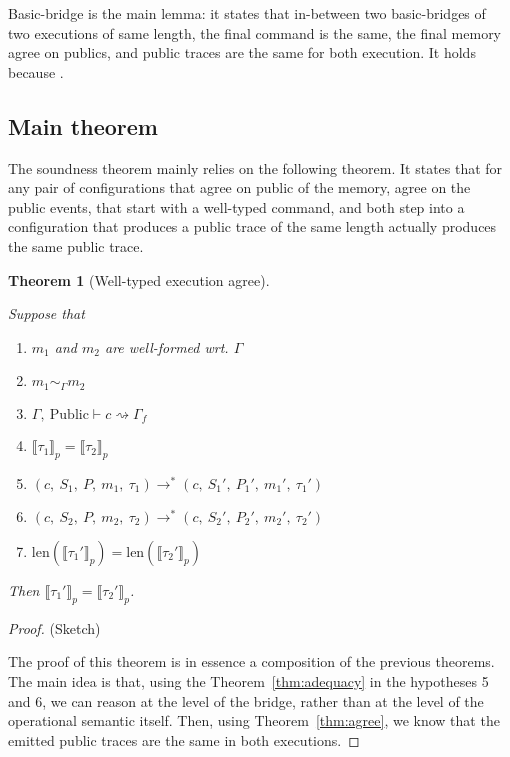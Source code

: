 \documentclass[10pt]{article}
\newcommand{\ctx}{\Gamma}
\newcommand{\typing}[4]{ #1,~#2 \vdash #3 \rightsquigarrow #4}
\newcommand{\exectrans}[2] { #1 \rightarrow^{*} #2 }
\newcommand{\pproj}[1]{\llbracket #1 \rrbracket_{p}}
\newcommand{\agree}[3]{#2 \sim_{#1} #3}
\newtheorem{theorem}{Theorem}
\begin{document}
Basic-bridge is the main lemma: it states that in-between two basic-bridges of two executions of
same length, the final command is the same, the final memory agree on publics, and
public traces are the same for both execution.
It holds because .


\subsection{Main theorem}%
\label{subsec:main_theorem}

The soundness theorem mainly relies on the following theorem. It states that for
any pair of configurations that agree on public of the memory, agree on the public events,
that start with a well-typed command, and both step into a configuration that produces a
public trace of the same length actually produces the same public trace.

\begin{theorem}[Well-typed execution agree]\label{thm:sound}

Suppose that

\begin{enumerate}
  \item $m_{1}$ and $m_{2}$ are well-formed wrt. $\ctx$
  \item $\agree{\ctx}{m_{1}}{m_{2}}$
  \item \( \typing{\ctx}{\mathrm{Public}}{c}{\ctx_{f}}\)
  \item $\pproj{\tau_{1}} = \pproj{\tau_{2}}$
  \item \(
        \exectrans
        {(c,~S_{1},~P,~m_{1},~\tau_{1})}
        {(c,~S_{1}',~P_{1}',~m_{1}',~\tau_{1}')}
        \)
  \item \(
        \exectrans
        {(c,~S_{2},~P,~m_{2},~\tau_{2})}
        {(c,~S_{2}',~P_{2}',~m_{2}',~\tau_{2}')}
        \)
  \item $\mathrm{len}(\pproj{\tau_{1}'}) = \mathrm{len}(\pproj{\tau_{2}'})$
\end{enumerate}

Then $\pproj{\tau_{1}'} = \pproj{\tau_{2}'}$.
\end{theorem}


\begin{proof} (Sketch)

  The proof of this theorem is in essence a composition of the previous theorems. The main idea is
  that, using the Theorem~\ref{thm:adequacy} in the hypotheses 5 and 6,
  we can reason at the level of the bridge, rather than at the level of the operational semantic
  itself.
  Then, using Theorem~\ref{thm:agree}, we know that the emitted public traces are the same in both
  executions.

\end{proof}
\end{document}
